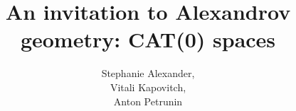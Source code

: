 \frontmatter
\title{An invitation to Alexandrov geometry: CAT(0) spaces}
\author{
Stephanie Alexander,\\
Vitali Kapovitch,\\ 
Anton Petrunin
}
\date{}
\maketitle
\thispagestyle{empty}
\newpage
\tableofcontents





\appendix



